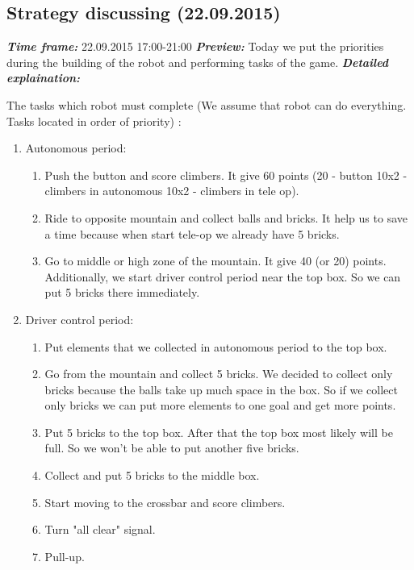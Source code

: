 \subsection{Strategy discussing (22.09.2015)}
\textit{\textbf{Time frame:}} 22.09.2015 17:00-21:00 \newline
\textit{\textbf{Preview:}} Today we put the priorities during the building of the robot and performing tasks of the game.\newline \newline
\textit{\textbf{Detailed explaination:}}
\begin{enumerate*}
	\item The tasks which robot must complete (We assume that robot can do everything. Tasks located in order of priority) :
	\begin{enumerate}
		\item Autonomous period:
		\begin{enumerate}
			\item Push the button and score climbers. It give 60 points (20 - button 10x2 - climbers in autonomous 10x2 - climbers in tele op).
			\item Ride to opposite mountain and collect balls and bricks. It help us to save a time because when start tele-op we already have 5 bricks. 
			\item Go to middle or high zone of the mountain. It give 40 (or 20) points. Additionally, we start driver control period near the top box. So we can put 5 bricks there immediately.
		\end{enumerate}
		\item Driver control period:
		\begin{enumerate}
			\item Put elements that we collected in autonomous period to the top box.
			\item Go from the mountain and collect 5 bricks. We decided to collect only bricks because the balls take up much space in the box. So if we collect only bricks we can put more elements to one goal and get more points.
			\item Put 5 bricks to the top box. After that the top box most likely will be full. So we won't be able to put another five bricks.
			\item Collect and put 5 bricks to the middle box.
			\item Start moving to the crossbar and score climbers.
			\item Turn "all clear" signal.
			\item Pull-up.

\end{enumerate}
\end{enumerate}
\end{enumerate*}
